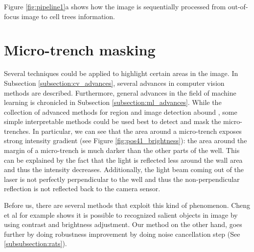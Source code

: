 \documentclass[pdftex,12pt,a4paper]{report}
\begin{document}
Figure \ref{fig:pipeline1}a shows how the image is sequentially processed from out-of-focus image to cell trees information.

\section{Micro-trench masking}
\label{subsection:micro_trench_masking}

Several techniques could be applied to highlight certain areas in the image. In Subsection \ref{subsection:cv_advances}, several advances in computer vision methods are described. Furthermore, general advances in the field of machine learning is chronicled in Subsection \ref{subsection:ml_advances}. While the collection of advanced methods for region and image detection abound \cite{krahenbuhl2011efficient, long2015fully, ronneberger2015u}, some simple interpretable methods could be used best to detect and mask the micro-trenches. In particular,  we can see that the area around a micro-trench exposes strong intensity gradient (see Figure \ref{fig:pos41_brightness}): the area around the margin of a micro-trench is much darker than the other parts of the well. This can be explained by the fact that the light is reflected less around the wall area and thus the intensity decreases. Additionally, the light beam coming out of the laser is not perfectly perpendicular to the well and thus the non-perpendicular reflection is not reflected back to the camera sensor.

Before us, there are several methods that exploit this kind of phenomenon. Cheng et al \cite{cheng2015global} for example shows it is possible to recognized salient objects in image by using contrast and brightness adjustment. Our method on the other hand, goes further by doing robustness improvement by doing noise cancellation step (See \ref{subsubsection:rats}).
\end{document}
